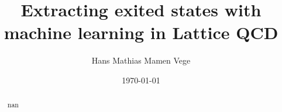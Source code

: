 \documentclass[11pt]{article}
\title{Extracting exited states with machine learning in Lattice QCD}
\author{Hans Mathias Mamen Vege}
\date{\today}
\begin{document}
\maketitle

\begin{abstract}
nan
\end{abstract}



















\end{document}
